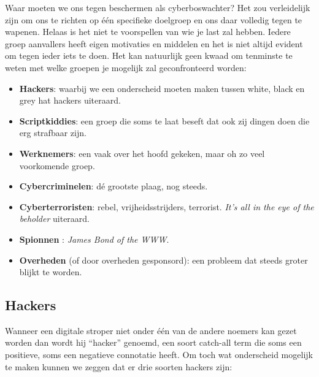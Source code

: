 \documentclass[
  10pt,
  dutch,
  paper=a4,
  ,captions=tableheading
]{scrbook}
\providecommand{\tightlist}{%
  \setlength{\itemsep}{0pt}\setlength{\parskip}{0pt}}
\begin{document}
Waar moeten we ons tegen beschermen als cyberboswachter? Het zou
verleidelijk zijn om ons te richten op één specifieke doelgroep en ons
daar volledig tegen te wapenen. Helaas is het niet te voorspellen van
wie je last zal hebben. Iedere groep aanvallers heeft eigen motivaties
en middelen en het is niet altijd evident om tegen ieder iets te doen.
Het kan natuurlijk geen kwaad om tenminste te weten met welke groepen je
mogelijk zal geconfronteerd worden:

\begin{itemize}
\tightlist
\item
  \textbf{Hackers}: waarbij we een onderscheid moeten maken tussen
  white, black en grey hat hackers uiteraard.
\item
  \textbf{Scriptkiddies}: een groep die soms te laat beseft dat ook zij
  dingen doen die erg strafbaar zijn.
\item
  \textbf{Werknemers}: een vaak over het hoofd gekeken, maar oh zo veel
  voorkomende groep.
\item
  \textbf{Cybercriminelen}: dé grootste plaag, nog steeds.
\item
  \textbf{Cyberterroristen}: rebel, vrijheidsstrijders, terrorist.
  \emph{It's all in the eye of the beholder} uiteraard.
\item
  \textbf{Spionnen} : \emph{James Bond of the WWW}.
\item
  \textbf{Overheden} (of door overheden gesponsord): een probleem dat
  steeds groter blijkt te worden.
\end{itemize}

\subsection{Hackers}\label{hackers}

Wanneer een digitale stroper niet onder één van de andere noemers kan
gezet worden dan wordt hij ``hacker'' genoemd, een soort catch-all term
die soms een positieve, soms een negatieve connotatie heeft. Om toch wat
onderscheid mogelijk te maken kunnen we zeggen dat er drie soorten
hackers zijn:
\end{document}
